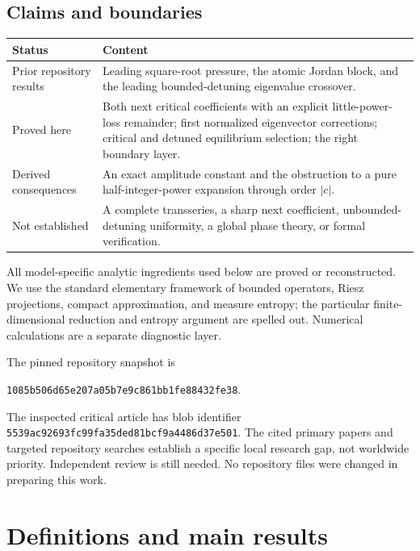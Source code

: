\documentclass[11pt,a4paper]{article}
\numberwithin{equation}{section}
\theoremstyle{definition}
\theoremstyle{remark}
\begin{document}
\subsection{Claims and boundaries}
\begin{center}
\begin{tabular}{@{}p{}p{}@{}}
\toprule
\textbf{Status} & \textbf{Content}\\
\midrule
Prior repository results & Leading square-root pressure, the atomic
Jordan block, and the leading bounded-detuning eigenvalue crossover.\\[2mm]
Proved here & Both next critical coefficients with an explicit
little-power-loss remainder; first normalized eigenvector corrections;
critical and detuned equilibrium selection; the right boundary layer.\\[2mm]
Derived consequences & An exact amplitude constant and the obstruction
to a pure half-integer-power expansion through order $|c|$.\\[2mm]
Not established & A complete transseries, a sharp next coefficient,
unbounded-detuning uniformity, a global phase theory, or formal verification.\\
\bottomrule
\end{tabular}
\end{center}

All model-specific analytic ingredients used below are proved or
reconstructed. We use the standard elementary framework of bounded
operators, Riesz projections, compact approximation, and measure entropy;
the particular finite-dimensional reduction and entropy argument are
spelled out. Numerical calculations are a separate diagnostic layer.

The pinned repository snapshot is
\begin{center}\small
\nolinkurl{1085b506d65e207a05b7e9c861bb1fe88432fe38}.
\end{center}
The inspected critical article has blob identifier
\nolinkurl{5539ac92693fc99fa35ded81bcf9a4486d37e501}.
The cited primary papers and targeted repository searches establish a
specific local research gap, not worldwide priority. Independent review
is still needed. No repository files were changed in preparing this work.

\section{Definitions and main results}
\label{sec:main}
\end{document}
